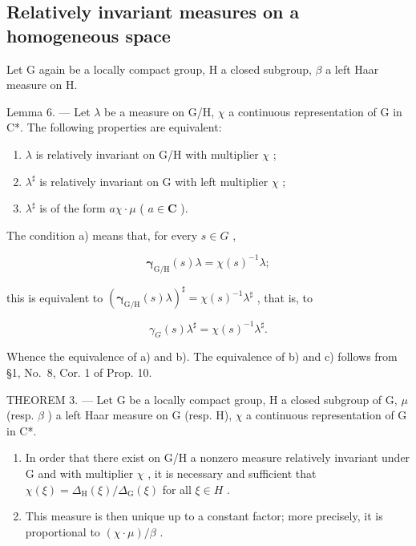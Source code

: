 \subsection{Relatively invariant measures on a homogeneous space}

Let G again be a locally compact group, H a closed subgroup, \(\beta\) a left Haar measure on H.

Lemma 6. --- Let \(\lambda\) be a measure on G/H, \(\chi\) a continuous representation of G in C*. The following properties are equivalent:

\begin{enumerate}
\def\labelenumi{\alph{enumi})}
\item
  \(\lambda\) is relatively invariant on G/H with multiplier \(\chi\) ;
\item
  \(\lambda^{\sharp}\) is relatively invariant on G with left multiplier \(\chi\) ;
\item
  \(\lambda^{\sharp}\) is of the form \(a\chi \cdot \mu\) ( \(a \in \mathbf{C}\) ).
\end{enumerate}

The condition a) means that, for every \(s \in G\) ,

\[
\pmb {\gamma} _ {\mathrm{G/H}} (s) \lambda = \chi (s) ^ {- 1} \lambda ;
\]

this is equivalent to \(\left(\pmb{\gamma}_{\mathrm{G / H}}(s)\lambda\right)^{\sharp} = \chi (s)^{-1}\lambda^{\sharp}\) , that is, to

\[
\gamma_ {G} (s) \lambda^ {\sharp} = \chi (s) ^ {- 1} \lambda^ {\sharp}.
\]

Whence the equivalence of a) and b). The equivalence of b) and c) follows from §1, No.~8, Cor. 1 of Prop. 10.

THEOREM 3. --- Let G be a locally compact group, H a closed subgroup of G, \(\mu\) (resp. \(\beta\) ) a left Haar measure on G (resp. H), \(\chi\) a continuous representation of G in C*.

\begin{enumerate}
\def\labelenumi{\alph{enumi})}
\item
  In order that there exist on G/H a nonzero measure relatively invariant under G and with multiplier \(\chi\) , it is necessary and sufficient that \(\chi(\xi)=\Delta_{\mathrm{H}}(\xi)/\Delta_{\mathrm{G}}(\xi)\) for all \(\xi\in H\) .
\item
  This measure is then unique up to a constant factor; more precisely, it is proportional to \((\chi \cdot \mu) / \beta\) .
\end{enumerate}

